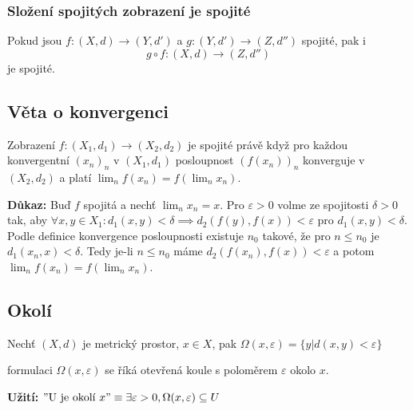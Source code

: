 \documentclass[../main.tex]{subfiles}
\begin{document}
\subsubsection{Složení spojitých zobrazení je spojité}

\hspace{1.2mm}
Pokud jsou $f: (X,d) \to (Y, d')$ a $g: (Y,d') \to (Z, d'')$ spojité, pak i
\[ g \circ f: (X,d) \to (Z,d'') \] je spojité.

\subsection{Věta o konvergenci}
\hspace{1.2mm}
Zobrazení $f: (X_1,d_1) \rightarrow (X_2,d_2)$ je spojité právě když pro každou konvergentní $(x_n)_n$ v $(X_1,d_1)$ 
posloupnost $(f(x_n))_n$ konverguje v $(X_2,d_2)$ a platí $\lim_n f(x_n) = f(\lim_n x_n)$.

\noindent
\hspace{1.2mm}
\textbf{Důkaz:}
Buď $f$ spojitá a nechť $\lim_nx_n = x$. Pro $\varepsilon > 0$ volme ze spojitosti $\delta > 0$
tak, aby $\forall x,y \in X_1 : d_1(x,y) <\delta \implies d_2(f(y),f(x)) <\varepsilon$ pro $d_1(x,y) < \delta$.
Podle definice konvergence posloupnosti existuje $n_0$ takové, že pro $n\leq n_0$ je $d_1(x_n,x) < \delta$. Tedy je-li $n \leq n_0$
máme $d_2(f(x_n),f(x)) < \varepsilon$ a potom $\lim_n f(x_n) = f(\lim_n x_n)$.


\subsection{Okolí}
\hspace{1.2mm}
Nechť $(X,d)$ je metrický prostor, $x\in X$, pak
$\Omega (x,\varepsilon) = \{ y | d(x,y) < \varepsilon \}$

formulaci $\Omega (x,\varepsilon)$ se říká otevřená koule s poloměrem $\varepsilon$ okolo $x$.
\vspace{5mm}

\noindent
\hspace{1.2mm}
\textbf{Užití:}
$"\textrm{U je okolí } x" \equiv \exists \varepsilon > 0, \Omega (x,\varepsilon) \subseteq U $

\end{document}
